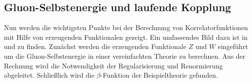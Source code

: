     

    
    
  \subsection{Gluon-Selbstenergie und laufende Kopplung}\label{selbstenergie}
    Nun werden 
    die wichtigsten Punkte bei der Berechnung von Korrelatorfunktionen mit 
    Hilfe von erzeugenden Funktionalen gezeigt. Ein umfassendes Bild 
    dazu ist in \cite{Schwartz} und \cite{Zinn} zu finden.
    Zunächst werden die erzeugenden Funktionale $Z$ und $W$ eingeführt um 
    die Gluon-Selbstenergie in einer vereinfachten Theorie zu berechnen. Aus der 
    Rechnung wird die 
    Notwendigkeit der Regularisierung und Renormierung abgeleitet. Schließlich 
    wird die $\beta$-Funktion der Beispieltheorie gefunden.
    
